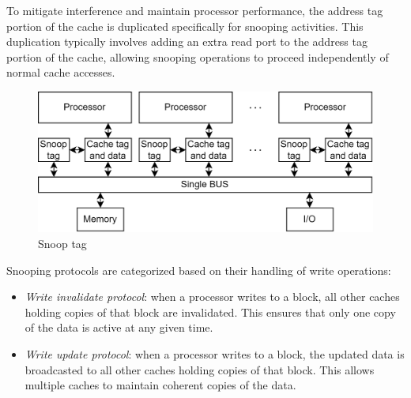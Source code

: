 To mitigate interference and maintain processor performance, the address tag portion of the cache is duplicated specifically for snooping activities. 
This duplication typically involves adding an extra read port to the address tag portion of the cache, allowing snooping operations to proceed independently of normal cache accesses.
\begin{figure}[H]
    \centering
    \includegraphics[width=0.75\linewidth]{images/snopt.png}
    \caption{Snoop tag}
\end{figure}
Snooping protocols are categorized based on their handling of write operations:
\begin{itemize}
    \item \textit{Write invalidate protocol}: when a processor writes to a block, all other caches holding copies of that block are invalidated. 
        This ensures that only one copy of the data is active at any given time.
    \item \textit{Write update protocol}: when a processor writes to a block, the updated data is broadcasted to all other caches holding copies of that block. 
        This allows multiple caches to maintain coherent copies of the data.
\end{itemize}

